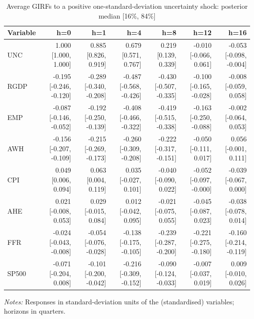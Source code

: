 \begin{table}[htbp]
\centering
\caption{Average GIRFs to a positive one-standard-deviation uncertainty shock: posterior median [16\%, 84\%]}
\label{tab:girfpos}
\begin{tabular}{lrrrrrr}
\toprule
Variable & h=0 & h=1 & h=4 & h=8 & h=12 & h=16 \\
\midrule
UNC & 1.000 [1.000, 1.000] & 0.885 [0.826, 0.919] & 0.679 [0.571, 0.767] & 0.219 [0.139, 0.339] & -0.010 [-0.066, 0.061] & -0.053 [-0.098, -0.004] \\
RGDP & -0.195 [-0.246, -0.120] & -0.289 [-0.340, -0.208] & -0.487 [-0.568, -0.426] & -0.430 [-0.507, -0.335] & -0.100 [-0.165, -0.028] & -0.008 [-0.059, 0.058] \\
EMP & -0.087 [-0.146, -0.052] & -0.192 [-0.250, -0.139] & -0.408 [-0.466, -0.322] & -0.419 [-0.515, -0.338] & -0.163 [-0.250, -0.088] & -0.002 [-0.064, 0.053] \\
AWH & -0.156 [-0.207, -0.109] & -0.215 [-0.269, -0.173] & -0.260 [-0.309, -0.208] & -0.222 [-0.317, -0.151] & -0.050 [-0.111, 0.017] & 0.056 [-0.001, 0.111] \\
CPI & 0.049 [0.006, 0.094] & 0.063 [0.004, 0.119] & 0.035 [-0.027, 0.101] & -0.040 [-0.090, 0.022] & -0.052 [-0.097, -0.000] & -0.039 [-0.067, 0.000] \\
AHE & 0.021 [-0.008, 0.053] & 0.029 [-0.015, 0.084] & 0.012 [-0.042, 0.095] & -0.021 [-0.075, 0.055] & -0.045 [-0.087, 0.023] & -0.038 [-0.078, 0.014] \\
FFR & -0.024 [-0.043, -0.008] & -0.054 [-0.076, -0.028] & -0.138 [-0.175, -0.105] & -0.239 [-0.287, -0.200] & -0.221 [-0.275, -0.180] & -0.160 [-0.214, -0.119] \\
SP500 & -0.071 [-0.204, 0.008] & -0.101 [-0.200, -0.042] & -0.216 [-0.309, -0.152] & -0.090 [-0.124, -0.033] & -0.007 [-0.037, 0.019] & 0.009 [-0.010, 0.026] \\
\bottomrule
\end{tabular}
\begin{minipage}{0.95\linewidth}\footnotesize\emph{Notes:} Responses in standard-deviation units of the (standardised) variables; horizons in quarters.\end{minipage}
\end{table}